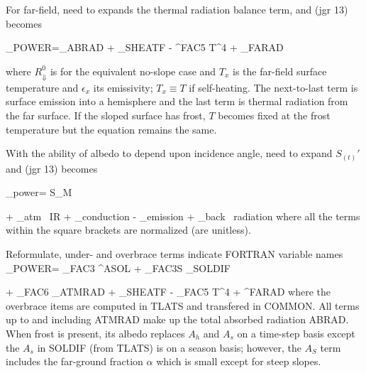 For far-field, need to expands the thermal radiation balance term, and (jgr 13) becomes  

\qbn {}_{POWER}=_{ABRAD}
+ _{SHEATF}  
-  \overbrace{\epsilon \sigma}^{FAC5} T^4  
+ _{FARAD}   \qen

where $R_{\Downarrow}^0$ is for the equivalent no-slope case and $T_x$ is the
far-field  surface temperature and $\epsilon_x$ its emissivity; $T_x \equiv
T $ if self-heating.  The next-to-last term is surface emission into a
hemisphere and the last term is thermal radiation from the far surface. If the
sloped surface has frost, $T$ becomes fixed at the frost temperature but the
equation remains the same.

With the ability of albedo to depend upon incidence angle, need to expand $ S_{(t)}'$ and (jgr 13) becomes 

\qb {}_{power}=  S_M  
\qe

\qbn
+ _{atm \ IR}
+ _{conduction}  
- _{emission}  
+ _{back \ radiation} \qen 
 where all the terms within the square brackets are normalized (are unitless).

Reformulate, under- and overbrace terms indicate FORTRAN variable names 
\qb {}_{POWER}=  _{FAC3}
 ^{ASOL}
+  _{FAC3S} _{SOLDIF} 
\qe

\qbn
+ \underbrace{\Omega \epsilon}_{FAC6} _{ATMRAD}
+ _{SHEATF}  
- \underbrace{\epsilon \sigma}_{FAC5} T^4  
+ ^{FARAD}    
where the overbrace items are computed in TLATS and
transfered in COMMON. All terms up to and including ATMRAD make up the total
absorbed radiation ABRAD.  When frost is present, its albedo replaces $A_h$ and
$A_s$ on a time-step basis except the $A_s$ in SOLDIF (from TLATS) is on a
season basis; however, the $A_S$ term includes the far-ground fraction $\alpha$
which is small except for steep slopes.

